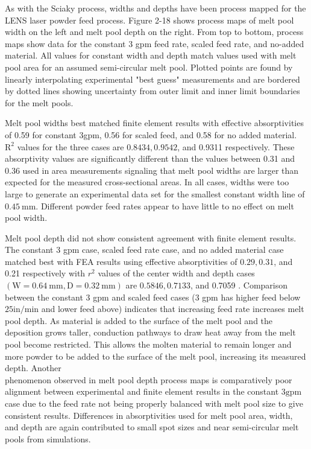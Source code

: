 \documentclass[10pt]{article}
\begin{document}
As with the Sciaky process, widths and depths have been process mapped for the LENS laser powder feed process. Figure 2-18 shows process maps of melt pool width on the left and melt pool depth on the right. From top to bottom, process maps show data for the constant 3 gpm feed rate, scaled feed rate, and no-added material. All values for constant width and depth match values used with melt pool area for an assumed semi-circular melt pool. Plotted points are found by linearly interpolating experimental "best guess" measurements and are bordered by dotted lines showing uncertainty from outer limit and inner limit boundaries for the melt pools.

Melt pool widths best matched finite element results with effective absorptivities of 0.59 for constant 3gpm, 0.56 for scaled feed, and 0.58 for no added material. $\mathrm{R}^{2}$ values for the three cases are $0.8434,0.9542$, and 0.9311 respectively. These absorptivity values are significantly different than the values between 0.31 and 0.36 used in area measurements signaling that melt pool widths are larger than expected for the measured cross-sectional areas. In all cases, widths were too large to generate an experimental data set for the smallest constant width line of $0.45 \mathrm{~mm}$. Different powder feed rates appear to have little to no effect on melt pool width.

Melt pool depth did not show consistent agreement with finite element results. The constant 3 gpm case, scaled feed rate case, and no added material case matched best with FEA results using effective absorptivities of $0.29,0.31$, and 0.21 respectively with $r^{2}$ values of the center width and depth cases $(\mathrm{W}=0.64 \mathrm{~mm}, \mathrm{D}=0.32 \mathrm{~mm})$ are $0.5846,0.7133$, and 0.7059 . Comparison between the constant 3 gpm and scaled feed cases (3 gpm has higher feed below $25 \mathrm{in} / \mathrm{min}$ and lower feed above) indicates that increasing feed rate increases melt pool depth. As material is added to the surface of the melt pool and the deposition grows taller, conduction pathways to draw heat away from the melt pool become restricted. This allows the molten material to remain longer and more powder to be added to the surface of the melt pool, increasing its measured depth. Another\\
phenomenon observed in melt pool depth process maps is comparatively poor alignment between experimental and finite element results in the constant $3 \mathrm{gpm}$ case due to the feed rate not being properly balanced with melt pool size to give consistent results. Differences in absorptivities used for melt pool area, width, and depth are again contributed to small spot sizes and near semi-circular melt pools from simulations.
\end{document}
